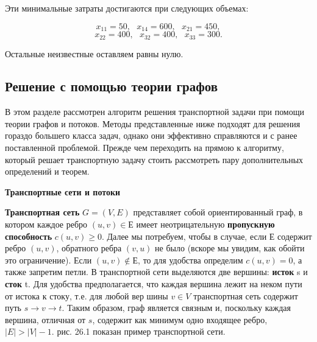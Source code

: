 \documentclass[a4paper,12pt]{article}
\begin{document}
	Эти минимальные затраты достигаются при следующих объемах:
	
	\[
		x_{11} = 50, \ \ \ x_{14} = 600, \ \ \ x_{21} = 450,
	\]
	\[
		x_{22} = 400, \ \ \ x_{32} = 400, \ \ \ x_{33} = 300.
	\]
	
	Остальные неизвестные оставляем равны нулю.
	\clearpage

	\subsection{Решение с помощью теории графов}
	
	В этом разделе рассмотрен алгоритм решения транспортной задачи при помощи теории графов и потоков. Методы представленные ниже подходят для решения гораздо большего класса задач, однако они эффективно справляются и с ранее поставленной проблемой. Прежде чем переходить на прямою к алгоритму, который решает транспортную задачу стоить рассмотреть пару дополнительных определений и теорем.
	
	\textbf{Транспортные сети и потоки}
	
	\textbf{Транспортная сеть} $G = (V, E)$ представляет собой ориентированный граф, в котором каждое ребро $(u, v) \in Е$ имеет неотрицательную \textbf{ пропускную способность} $c(u,v) \geqslant 0$. Далее мы потребуем, чтобы в случае, если $Е$ содержит ребро $(u,v)$, обратного ребра $(v,u)$ не было (вскоре мы	увидим, как обойти это ограничение). Если $(u,v) \notin Е$, то для удобства определим $c(u,v) = 0$, а также запретим петли. В транспортной сети выделяются две вершины: \textbf{исток} s и \textbf{сток} t. Для удобства предполагается, что каждая вершина лежит на неком пути от истока к стоку, т.е. для любой вер	шины $v \in V$ транспортная сеть содержит путь $s \longrightarrow v \longrightarrow t$. Таким образом, граф является связным и, поскольку каждая вершина, отличная от $s$, содержит как минимум одно входящее ребро, $|E| > |V| - 1$. рис. 26.1 показан пример транспортной сети.
\end{document}
